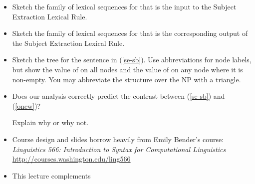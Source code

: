 \documentclass[a4paper,landscape,headrule,footrule]{foils}
\begin{document}
\begin{itemize}
\item [A.] Sketch the family of lexical sequences for  that is the input
to the Subject Extraction Lexical Rule.

\item [B.] Sketch the family of lexical sequences for  that is the
corresponding output of the Subject Extraction Lexical Rule.


\item[C.] Sketch the %
tree for the sentence in (\ref{se-sb}).
Use abbreviations for node labels, but show the value of  on
all nodes and the value of  on any node where it is non-empty.
You may abbreviate the structure over the NP  with a triangle.

\item[D.] Does our analysis correctly predict the contrast between
(\ref{se-sb}) and (\ref{onew})?\\
\begin{exe}
  \ex \label{onew} 
\end{exe}
Explain why or why not.
\end{itemize}

% 


\begin{itemize}
\item Course design and slides borrow heavily from Emily Bender's course:
\textit{Linguistics 566: Introduction to Syntax for Computational Linguistics}
\\ \url{http://courses.washington.edu/ling566}
\item This lecture complements \citet[Chapter 14]{sag:wasow:bender:2003}
\end{itemize}




\end{document}
